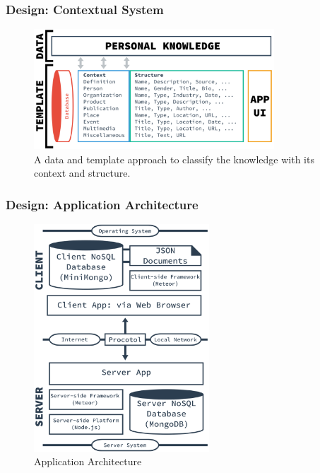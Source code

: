 \documentclass[10pt, compress]{beamer}
\begin{document}

\begin{frame}[fragile]
  \frametitle{Design: Contextual System}

  \begin{figure}[ht]
    \centering
    \includegraphics[width=9cm]{include/satellid-contextual.png}
    \caption{A data and template approach to classify the knowledge with its context and structure.}
    \label{fig:satellid-contextual}
  \end{figure}

\end{frame}


\begin{frame}[fragile]
  \frametitle{Design: Application Architecture}

  \begin{figure}[ht]
    \centering
    \vspace{-25pt}
    \includegraphics[height=8.5cm]{include/satellid-app-arch.png}
    \vspace{-10pt}
    \caption{Application Architecture}
    \label{fig:satellid-app-arch}
  \end{figure}

\end{frame}
\end{document}
